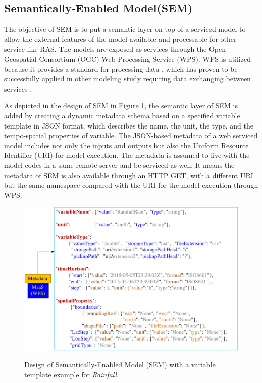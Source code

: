 \documentclass[review]{elsarticle}
\begin{document}
\subsection{Semantically-Enabled Model(SEM)}The objective of SEM is to put a semantic layer on top of a serviced model to allow the external features of the model available and processable for other service like RAS. The models are exposed as services through the Open Geospatial Consortium (OGC) Web Processing Service (WPS). WPS is utilized because it provides a standard for processing data \citep{schut2007opengis}, which has proven to be successfully applied in other modeling study requiring data exchanging between services \citep{castronova2013, goodall2011, schaeffer2008,vitolo2012}.  

As depicted in the design of SEM in Figure \ref{figure4}, the semantic layer of SEM is added by creating a dynamic metadata schema based on a specified variable template in JSON format, which describes the name, the unit, the type, and the tempo-spatial properties of variable. The JSON-based metadata of a web serviced model includes not only the inputs and outputs but also the Uniform Resource Identifier (URI) for model execution. The metadata is assumed to live with the model codes in a same remote server and be serviced as well. It means the metadata of SEM is also available through an HTTP GET, with a different URI but the same namespace compared with the URI for the model execution through WPS.  

\begin{figure}[!htbp]
\centering
\includegraphics[scale=0.4]{../figures/figure_4}
\label{figure4}
\caption{Design of Semantically-Enabled Model (SEM) with a variable template example for \textit{Rainfall}.}
\end{figure}
\end{document}
